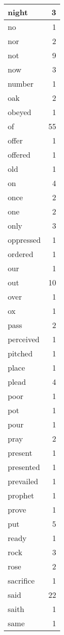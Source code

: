\begin{center}
\begin{longtable}{l|r}
night & 3\\ \hline 
no & 1\\ \hline 
nor & 2\\ \hline 
not & 9\\ \hline 
now & 3\\ \hline 
number & 1\\ \hline 
oak & 2\\ \hline 
obeyed & 1\\ \hline 
of & 55\\ \hline 
offer & 1\\ \hline 
offered & 1\\ \hline 
old & 1\\ \hline 
on & 4\\ \hline 
once & 2\\ \hline 
one & 2\\ \hline 
only & 3\\ \hline 
oppressed & 1\\ \hline 
ordered & 1\\ \hline 
our & 1\\ \hline 
out & 10\\ \hline 
over & 1\\ \hline 
ox & 1\\ \hline 
pass & 2\\ \hline 
perceived & 1\\ \hline 
pitched & 1\\ \hline 
place & 1\\ \hline 
plead & 4\\ \hline 
poor & 1\\ \hline 
pot & 1\\ \hline 
pour & 1\\ \hline 
pray & 2\\ \hline 
present & 1\\ \hline 
presented & 1\\ \hline 
prevailed & 1\\ \hline 
prophet & 1\\ \hline 
prove & 1\\ \hline 
put & 5\\ \hline 
ready & 1\\ \hline 
rock & 3\\ \hline 
rose & 2\\ \hline 
sacrifice & 1\\ \hline 
said & 22\\ \hline 
saith & 1\\ \hline 
same & 1\\ \hline 

\end{longtable}
\end{center}
